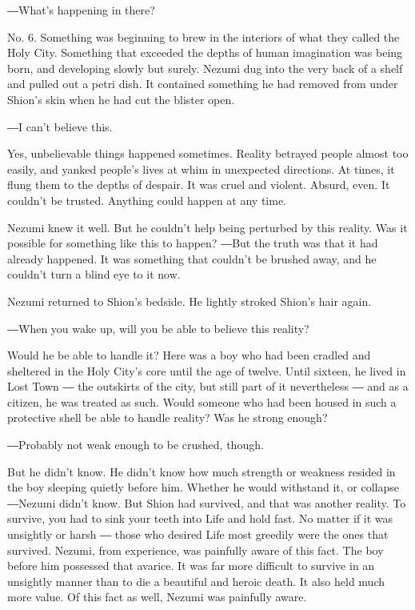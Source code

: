 ―What's happening in there?

No. 6. Something was beginning to brew in the interiors of what they
called the Holy City. Something that exceeded the depths of human
imagination was being born, and developing slowly but surely. Nezumi dug
into the very back of a shelf and pulled out a petri dish. It contained
something he had removed from under Shion's skin when he had cut the
blister open.

―I can't believe this.

Yes, unbelievable things happened sometimes. Reality betrayed people
almost too easily, and yanked people's lives at whim in unexpected
directions. At times, it flung them to the depths of despair. It was
cruel and violent. Absurd, even. It couldn't be trusted. Anything could
happen at any time.

Nezumi knew it well. But he couldn't help being perturbed by this
reality. Was it possible for something like this to happen? ―But the
truth was that it had already happened. It was something that couldn't
be brushed away, and he couldn't turn a blind eye to it now.

Nezumi returned to Shion's bedside. He lightly stroked Shion's hair
again.

―When you wake up, will you be able to believe this reality?

Would he be able to handle it? Here was a boy who had been cradled and
sheltered in the Holy City's core until the age of twelve. Until
sixteen, he lived in Lost Town ― the outskirts of the city, but still
part of it nevertheless ― and as a citizen, he was treated as such.
Would someone who had been housed in such a protective shell be able to
handle reality? Was he strong enough?

―Probably not weak enough to be crushed, though.

But he didn't know. He didn't know how much strength or weakness resided
in the boy sleeping quietly before him. Whether he would withstand it,
or collapse ―Nezumi didn't know. But Shion had survived, and that was
another reality. To survive, you had to sink your teeth into Life and
hold fast. No matter if it was unsightly or harsh ― those who desired
Life most greedily were the ones that survived. Nezumi, from experience,
was painfully aware of this fact. The boy before him possessed that
avarice. It was far more difficult to survive in an unsightly manner
than to die a beautiful and heroic death. It also held much more value.
Of this fact as well, Nezumi was painfully aware.


